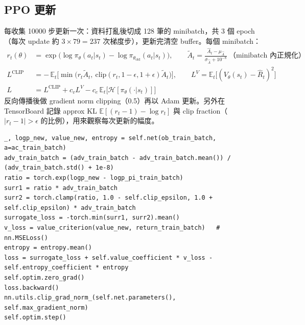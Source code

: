 \documentclass[11pt,a4paper]{article}
\begin{document}
\subsection{PPO 更新}
每收集 10000 步更新一次：資料打亂後切成 128 筆的 minibatch，共 3 個 epoch（每次 update 約 $3\times79=237$ 次梯度步），更新完清空 buffer。每個 minibatch：
\begin{align*}
r_t(\theta) &= \exp\big(\log\pi_\theta(a_t|s_t)-\log\pi_{\theta_\text{old}}(a_t|s_t)\big),\qquad
\tilde A_t = \frac{\hat A_t-\mu_{\hat A}}{\sigma_{\hat A}+10^{-8}}\ \text{（minibatch 內正規化）}\\
L^{\text{CLIP}} &= -\,\mathbb{E}_t\Big[\min\big(r_t\tilde A_t,\ \mathrm{clip}(r_t,1-\epsilon,1+\epsilon)\tilde A_t\big)\Big],\qquad
L^{V} = \mathbb{E}_t\big[(V_\theta(s_t)-\hat R_t)^2\big]\\
L &= L^{\text{CLIP}} + c_v L^{V} - c_e\,\mathbb{E}_t\big[\mathcal{H}[\pi_\theta(\cdot|s_t)]\big]
\end{align*}
反向傳播後做 gradient norm clipping（0.5）再以 Adam 更新。另外在 TensorBoard 記錄 approx KL $\mathbb{E}[(r_t-1)-\log r_t]$ 與 clip fraction（$|r_t-1|>\epsilon$ 的比例），用來觀察每次更新的幅度。

\begin{lstlisting}
_, logp_new, value_new, entropy = self.net(ob_train_batch, a=ac_train_batch)
adv_train_batch = (adv_train_batch - adv_train_batch.mean()) / (adv_train_batch.std() + 1e-8)
ratio = torch.exp(logp_new - logp_pi_train_batch)
surr1 = ratio * adv_train_batch
surr2 = torch.clamp(ratio, 1.0 - self.clip_epsilon, 1.0 + self.clip_epsilon) * adv_train_batch
surrogate_loss = -torch.min(surr1, surr2).mean()
v_loss = value_criterion(value_new, return_train_batch)   # nn.MSELoss()
entropy = entropy.mean()
loss = surrogate_loss + self.value_coefficient * v_loss - self.entropy_coefficient * entropy
self.optim.zero_grad()
loss.backward()
nn.utils.clip_grad_norm_(self.net.parameters(), self.max_gradient_norm)
self.optim.step()
\end{lstlisting}
\end{document}
